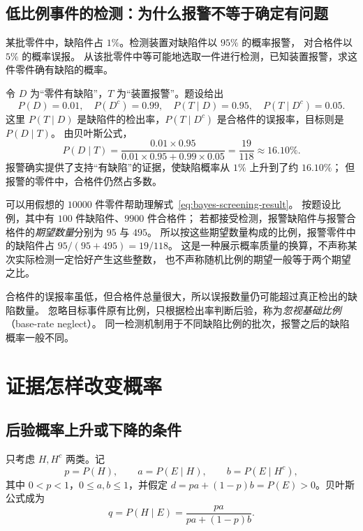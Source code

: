 \documentclass[UTF8,12pt,a4paper,fontset=fandol]{ctexart}
\begin{document}
\subsection{低比例事件的检测：为什么报警不等于确定有问题}

\begin{example}[自动质检中的误报]
\label{ex:bayes-screening}
某批零件中，缺陷件占 $1\%$。检测装置对缺陷件以 $95\%$ 的概率报警，
对合格件以 $5\%$ 的概率误报。
从该批零件中等可能地选取一件进行检测，已知装置报警，求这件零件确有缺陷的概率。
\end{example}
\begin{solve}
令 $D$ 为“零件有缺陷”，$T$ 为“装置报警”。题设给出
\[
  P(D)=0.01,\quad P(D^c)=0.99,\quad
  P(T\mid D)=0.95,\quad P(T\mid D^c)=0.05.
\]
这里 $P(T\mid D)$ 是缺陷件的检出率，$P(T\mid D^c)$ 是合格件的误报率，目标则是 $P(D\mid T)$。
由贝叶斯公式，
\begin{equation}
  P(D\mid T)
  =\frac{0.01\times0.95}{0.01\times0.95+0.99\times0.05}
  =\frac{19}{118}\approx16.10\%.
  \label{eq:bayes-screening-result}
\end{equation}
报警确实提供了支持“有缺陷”的证据，使缺陷概率从 $1\%$ 上升到了约 $16.10\%$；
但报警的零件中，合格件仍然占多数。
\end{solve}

可以用假想的 $10000$ 件零件帮助理解式~\eqref{eq:bayes-screening-result}。
按题设比例，其中有 $100$ 件缺陷件、$9900$ 件合格件；
若都接受检测，报警缺陷件与报警合格件的\emph{期望数量}分别为 $95$ 与 $495$。
所以按这些期望数量构成的比例，报警零件中的缺陷件占 $95/(95+495)=19/118$。
这是一种展示概率质量的换算，不声称某次实际检测一定恰好产生这些整数，
也不声称随机比例的期望一般等于两个期望之比。

合格件的误报率虽低，但合格件总量很大，所以误报数量仍可能超过真正检出的缺陷数量。
忽略目标事件原有比例，只根据检出率判断后验，称为\emph{忽视基础比例}（base-rate neglect）。
同一检测机制用于不同缺陷比例的批次，报警之后的缺陷概率一般不同。

\section{证据怎样改变概率}
\label{sec:bayes-evidence}

\subsection{后验概率上升或下降的条件}

只考虑 $H,H^c$ 两类。记
\[
  p=P(H),\qquad a=P(E\mid H),\qquad b=P(E\mid H^c),
\]
其中 $0<p<1$，$0\leq a,b\leq1$，并假定
$d=pa+(1-p)b=P(E)>0$。贝叶斯公式成为
\begin{equation}
  q=P(H\mid E)=\frac{pa}{pa+(1-p)b}.
  \label{eq:bayes-binary}
\end{equation}
\end{document}
